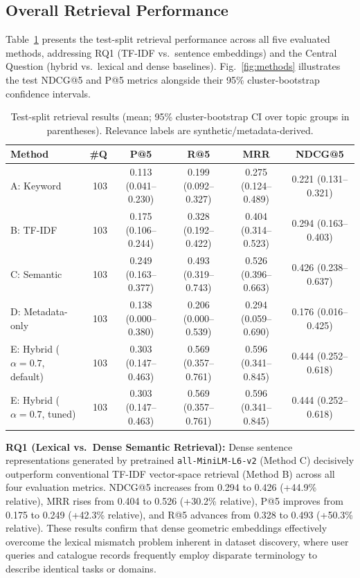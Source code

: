 \documentclass[conference]{IEEEtran}
\begin{document}
\subsection{Overall Retrieval Performance}
Table~\ref{tab:main} presents the test-split retrieval performance across all five evaluated methods, addressing RQ1 (TF-IDF vs.\ sentence embeddings) and the Central Question (hybrid vs.\ lexical and dense baselines). Fig.~\ref{fig:methods} illustrates the test NDCG@5 and P@5 metrics alongside their 95\% cluster-bootstrap confidence intervals.

\begin{table}[t]
\centering
\caption{Test-split retrieval results (mean; 95\% cluster-bootstrap CI over topic groups in parentheses). Relevance labels are synthetic/metadata-derived.}
\label{tab:main}
\scriptsize
\begin{tabular}{lrcccc}
\toprule
Method & \#Q & P@5 & R@5 & MRR & NDCG@5 \\
\midrule
A: Keyword & 103 & 0.113 (0.041--0.230) & 0.199 (0.092--0.327) & 0.275 (0.124--0.489) & 0.221 (0.131--0.321) \\
B: TF-IDF & 103 & 0.175 (0.106--0.244) & 0.328 (0.192--0.422) & 0.404 (0.314--0.523) & 0.294 (0.163--0.403) \\
C: Semantic & 103 & 0.249 (0.163--0.377) & 0.493 (0.319--0.743) & 0.526 (0.396--0.663) & 0.426 (0.238--0.637) \\
D: Metadata-only & 103 & 0.138 (0.000--0.380) & 0.206 (0.000--0.539) & 0.294 (0.059--0.690) & 0.176 (0.016--0.425) \\
E: Hybrid ($\alpha=0.7$, default) & 103 & 0.303 (0.147--0.463) & 0.569 (0.357--0.761) & 0.596 (0.341--0.845) & 0.444 (0.252--0.618) \\
E: Hybrid ($\alpha=0.7$, tuned) & 103 & 0.303 (0.147--0.463) & 0.569 (0.357--0.761) & 0.596 (0.341--0.845) & 0.444 (0.252--0.618) \\
\bottomrule
\end{tabular}
\end{table}

\textbf{RQ1 (Lexical vs.\ Dense Semantic Retrieval):} Dense sentence representations generated by pretrained \texttt{all-MiniLM-L6-v2} (Method C) decisively outperform conventional TF-IDF vector-space retrieval (Method B) across all four evaluation metrics. NDCG@5 increases from 0.294 to 0.426 (+44.9\% relative), MRR rises from 0.404 to 0.526 (+30.2\% relative), P@5 improves from 0.175 to 0.249 (+42.3\% relative), and R@5 advances from 0.328 to 0.493 (+50.3\% relative). These results confirm that dense geometric embeddings effectively overcome the lexical mismatch problem inherent in dataset discovery, where user queries and catalogue records frequently employ disparate terminology to describe identical tasks or domains.
\end{document}

